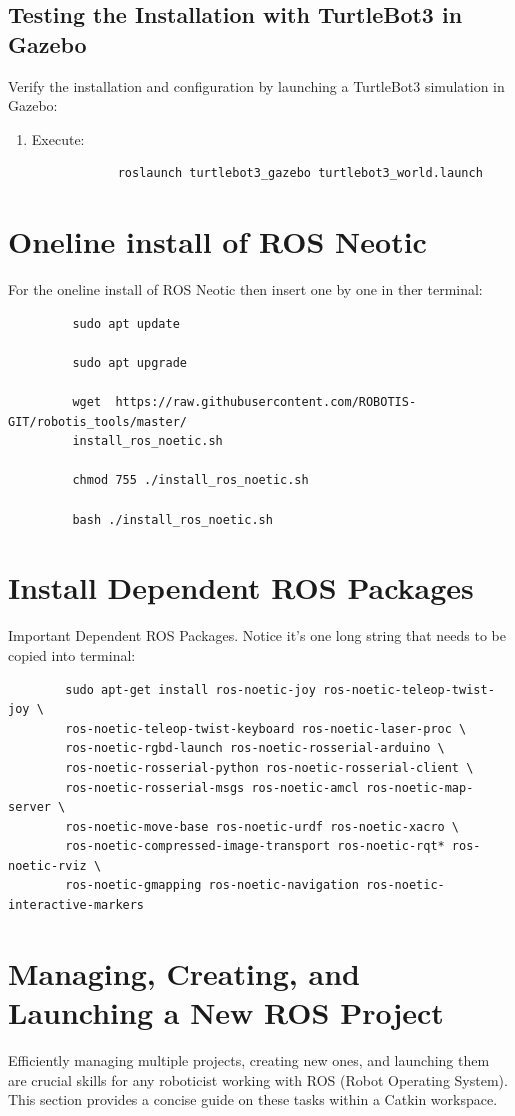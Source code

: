 \documentclass[12pt,a4paper]{article}
\begin{document}
	\subsection{Testing the Installation with TurtleBot3 in Gazebo}
	Verify the installation and configuration by launching a TurtleBot3 simulation in Gazebo:
	
	\begin{enumerate}
		\item Execute:
		\begin{verbatim}
			roslaunch turtlebot3_gazebo turtlebot3_world.launch
		\end{verbatim}
	\end{enumerate}
	\section{Oneline install of ROS Neotic}
	For the oneline install of ROS Neotic then insert one by one in ther terminal:
	\begin{verbatim}
		 sudo apt update
		 
		 sudo apt upgrade
		 
		 wget  https://raw.githubusercontent.com/ROBOTIS-GIT/robotis_tools/master/
		 install_ros_noetic.sh
		 
		 chmod 755 ./install_ros_noetic.sh
		 
		 bash ./install_ros_noetic.sh
	\end{verbatim}
	\section{Install Dependent ROS Packages}
	Important Dependent ROS Packages. Notice it's one long string that needs to be copied into terminal:
	\begin{verbatim}
		sudo apt-get install ros-noetic-joy ros-noetic-teleop-twist-joy \
		ros-noetic-teleop-twist-keyboard ros-noetic-laser-proc \
		ros-noetic-rgbd-launch ros-noetic-rosserial-arduino \
		ros-noetic-rosserial-python ros-noetic-rosserial-client \
		ros-noetic-rosserial-msgs ros-noetic-amcl ros-noetic-map-server \
		ros-noetic-move-base ros-noetic-urdf ros-noetic-xacro \
		ros-noetic-compressed-image-transport ros-noetic-rqt* ros-noetic-rviz \
		ros-noetic-gmapping ros-noetic-navigation ros-noetic-interactive-markers
	\end{verbatim}
	\section{Managing, Creating, and Launching a New ROS Project}
	Efficiently managing multiple projects, creating new ones, and launching them are crucial skills for any roboticist working with ROS (Robot Operating System). This section provides a concise guide on these tasks within a Catkin workspace.
	
\end{document}
